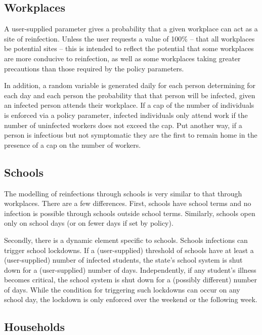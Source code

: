 \documentclass[a4paper,11pt]{scrreprt}
\begin{document}
\subsection{Workplaces}

A user-supplied parameter gives a probability that a given workplace can act as a site
of reinfection. Unless the user requests a value of 100\% -- that all workplaces 
be potential sites -- this is intended to reflect the potential that some workplaces are more
conducive to reinfection, as well as some workplaces taking greater precautions than those 
required by the policy parameters. 

In addition, a random variable is generated daily for each person determining for each day 
and each person the probability that that person will be infected, given an infected person
attends their workplace. If a cap of the number of individuals is enforced via a policy 
parameter, infected individuals only attend work if the number of uninfected workers does 
not exceed the cap. Put another way, if a person is infectious but not symptomatic they are 
the first to remain home in the presence of a cap on the number of workers.

\subsection{Schools}

The modelling of reinfections through schools is very similar to that through workplaces.
There are a few differences.
First, schools have school terms and no infection is possible through schools outside school terms.
Similarly, schools open only on school days (or on fewer days if set by policy).

Secondly, there is a dynamic element specific to schools. Schools infections can trigger school
lockdowns. If a (user-supplied) threshold of schools have at least a (user-supplied) number of 
infected students, the state's school system is shut down for a (user-supplied) number of days.
Independently, if any student's illness becomes critical, the school system is shut down for 
a (possibly different) number of days.  While the condition for triggering such lockdowns can occur
on any school day, the lockdown is only enforced over the weekend or the following week.

\subsection{Households}
\end{document}

